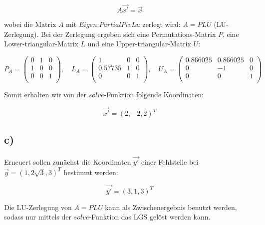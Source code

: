 \begin{equation*}
  A\vec{x'} = \vec{x}
\end{equation*}

\noindent
wobei die Matrix $A$ mit $\textit{Eigen:PartialPivLu}$ zerlegt wird: $A=PLU$ (LU-Zerlegung).
Bei der Zerlegung ergeben sich eine Permutations-Matrix $P$, eine Lower-triangular-Matrix
$L$ und eine Upper-triangular-Matrix $U$:

\begin{equation*}
  P_A =
  \left(\begin{array}{rrr}
    0 & 1 & 0 \\
    1 & 0 & 0 \\
    0 & 0 & 1 \\
  \end{array}\right),
  \quad
  L_A =
  \left(\begin{array}{rrr}
    1       &  0 & 0 \\
    0.57735 &  1 & 0 \\
    0       &  0 & 1 \\
  \end{array}\right),
  \quad
  U_A =
  \left(\begin{array}{rrr}
  0.866025 & 0.866025 & 0 \\
         0 &       -1 & 0 \\
         0 &        0 & 1 \\
  \end{array}\right)
\end{equation*}

\noindent
Somit erhalten wir von der $\textit{solve}$-Funktion
folgende Koordinaten:

\begin{equation*}
  \vec{x'} = (2,-2,2)^T
\end{equation*}

\subsection*{c)}
Erneuert sollen zunächst die Koordinaten $\vec{y'}$ einer Fehlstelle bei
$\vec{y}=(1,2 \sqrt{3}, 3)^{T}$ %
bestimmt werden:

\begin{equation*}
  \vec{y'} = (3,1,3)^T
\end{equation*}

\noindent
Die LU-Zerlegung von $A=PLU$ kann als Zwischenergebnis benutzt werden, sodass
nur mittels der $\textit{solve}$-Funktion das LGS gelöst werden kann.


